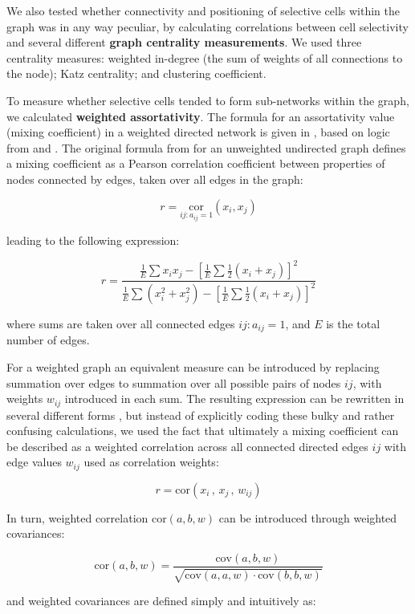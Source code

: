 \documentclass{article}
\begin{document}
We also tested whether connectivity and positioning of selective cells within the graph was in any way peculiar, by calculating correlations between cell selectivity and several different \textbf{graph centrality measurements}. We used three centrality measures: weighted in-degree (the sum of weights of all connections to the node); Katz centrality; and clustering coefficient.

To measure whether selective cells tended to form sub-networks within the graph, we calculated \textbf{weighted assortativity}. The formula for an assortativity value (mixing coefficient) in a weighted directed network is given in \citep{farine2014weighted}, based on logic from \citep{newman2003mixing} and \citep{leung2007weighted}. The original formula from \citep{newman2003mixing} for an unweighted undirected graph defines a mixing coefficient as a Pearson correlation coefficient between properties of nodes connected by edges, taken over all edges in the graph:

\[ r=\underset{ij: a_{ij}=1}{\text{cor}}(x_i,x_j) \]

leading to the following expression:

\[ r = \frac{\frac{1}{E} \sum{x_i x_j} - [\frac{1}{E} \sum{\frac{1}{2}(x_i+x_j)}]^2} {\frac{1}{E} \sum{(x_i^2+x_j^2)}-[\frac{1}{E} \sum{\frac{1}{2}(x_i+x_j)}]^2} \]

where sums are taken over all connected edges $ij: a_{ij}=1$, and $E$ is the total number of edges.

For a weighted graph an equivalent measure can be introduced by replacing summation over edges to summation over all possible pairs of nodes $ij$, with weights $w_{ij}$ introduced in each sum. The resulting expression can be rewritten in several different forms \citep{newman2003mixing,leung2007weighted,farine2014weighted,teller2014assortative}, but instead of explicitly coding these bulky and rather confusing calculations, we used the fact that ultimately a mixing coefficient can be described as a weighted correlation across all connected directed edges $ij$ with edge values $w_{ij}$ used as correlation weights:

\[ r=\text{cor}(x_i \, , \, x_j \, , \, w_{ij}) \]

In turn, weighted correlation $\text{cor}(a,b,w)$ can be introduced through weighted covariances: 

\[ \text{cor}(a,b,w) = \frac{\text{cov}(a,b,w)}{\sqrt{\text{cov}(a,a,w) \cdot \text{cov}(b,b,w)}} \]

and weighted covariances are defined simply and intuitively as: 
\end{document}
